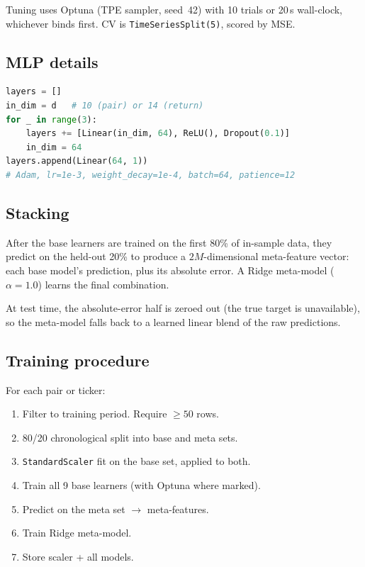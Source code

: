 \documentclass[11pt]{article}
\newcommand{\code}[1]{\texttt{#1}}
\begin{document}
Tuning uses Optuna (TPE sampler, seed~42) with 10 trials or 20\,s
wall-clock, whichever binds first.
CV is \code{TimeSeriesSplit(5)}, scored by MSE.

\subsection{MLP details}

\begin{lstlisting}[language=Python, caption={MLP architecture (identical for pair and return tasks).}]
layers = []
in_dim = d   # 10 (pair) or 14 (return)
for _ in range(3):
    layers += [Linear(in_dim, 64), ReLU(), Dropout(0.1)]
    in_dim = 64
layers.append(Linear(64, 1))
# Adam, lr=1e-3, weight_decay=1e-4, batch=64, patience=12
\end{lstlisting}

\subsection{Stacking}

After the base learners are trained on the first 80\% of in-sample data,
they predict on the held-out 20\% to produce a $2M$-dimensional meta-feature
vector: each base model's prediction, plus its absolute error.
A Ridge meta-model ($\alpha=1.0$) learns the final combination.

At test time, the absolute-error half is zeroed out
(the true target is unavailable), so the meta-model falls back
to a learned linear blend of the raw predictions.

\subsection{Training procedure}

For each pair or ticker:

\begin{enumerate}
\item Filter to training period.  Require $\ge 50$ rows.
\item 80/20 chronological split into base and meta sets.
\item \code{StandardScaler} fit on the base set, applied to both.
\item Train all 9 base learners (with Optuna where marked).
\item Predict on the meta set $\to$ meta-features.
\item Train Ridge meta-model.
\item Store scaler + all models.
\end{enumerate}
\end{document}
